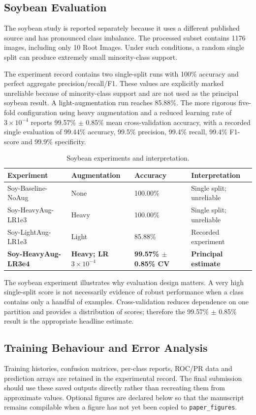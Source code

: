 \documentclass[a4paper,fleqn]{cas-dc}
\begin{document}
\subsection{Soybean Evaluation}
\label{sec:soybean}
The soybean study is reported separately because it uses a different published source and has pronounced class imbalance. The processed subset contains 1176 images, including only 10 Root Images. Under such conditions, a random single split can produce extremely small minority-class support.

The experiment record contains two single-split runs with 100\% accuracy and perfect aggregate precision/recall/F1. These values are explicitly marked unreliable because of minority-class support and are not used as the principal soybean result. A light-augmentation run reaches 85.88\%. The more rigorous five-fold configuration using heavy augmentation and a reduced learning rate of $3\times10^{-4}$ reports 99.57\% $\pm$ 0.85\% mean cross-validation accuracy, with a recorded single evaluation of 99.44\% accuracy, 99.5\% precision, 99.4\% recall, 99.4\% F1-score and 99.9\% specificity.

\begin{table}[!t]
\centering
\caption{Soybean experiments and interpretation.}
\label{tab:soybean}
\scriptsize
\begin{tabular}{p{2.8cm}p{2.2cm}p{2.0cm}p{2.3cm}}
\toprule
Experiment & Augmentation & Accuracy & Interpretation \\
\midrule
Soy-Baseline-NoAug & None & 100.00\% & Single split; unreliable \\
Soy-HeavyAug-LR1e3 & Heavy & 100.00\% & Single split; unreliable \\
Soy-LightAug-LR1e3 & Light & 85.88\% & Recorded experiment \\
\textbf{Soy-HeavyAug-LR3e4} & \textbf{Heavy; LR $3\times10^{-4}$} & \textbf{99.57\% $\pm$ 0.85\% CV} & \textbf{Principal estimate} \\
\bottomrule
\end{tabular}
\end{table}

The soybean experiment illustrates why evaluation design matters. A very high single-split score is not necessarily evidence of robust performance when a class contains only a handful of examples. Cross-validation reduces dependence on one partition and provides a distribution of scores; therefore the 99.57\% $\pm$ 0.85\% result is the appropriate headline estimate.

\subsection{Training Behaviour and Error Analysis}
Training histories, confusion matrices, per-class reports, ROC/PR data and prediction arrays are retained in the experimental record. The final submission should use these saved outputs directly rather than recreating them from approximate values. Optional figures are declared below so that the manuscript remains compilable when a figure has not yet been copied to \texttt{paper\_figures}.
\end{document}
